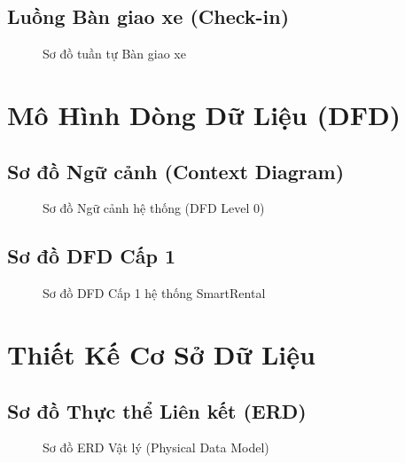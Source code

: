 \documentclass[12pt,a4paper]{report}
\begin{document}
\section{Luồng Bàn giao xe (Check-in)}
\begin{figure}[H]
    \centering
    \fbox{\rule{0pt}{3in} \rule{0.8\linewidth}{0pt}} %
    \caption{Sơ đồ tuần tự Bàn giao xe}
\end{figure}


\chapter{Mô Hình Dòng Dữ Liệu (DFD)}

\section{Sơ đồ Ngữ cảnh (Context Diagram)}
\begin{figure}[H]
    \centering
    \fbox{\rule{0pt}{3in} \rule{0.8\linewidth}{0pt}} %
    \caption{Sơ đồ Ngữ cảnh hệ thống (DFD Level 0)}
\end{figure}

\section{Sơ đồ DFD Cấp 1}
\begin{figure}[H]
    \centering
    \fbox{\rule{0pt}{4in} \rule{0.95\linewidth}{0pt}} %
    \caption{Sơ đồ DFD Cấp 1 hệ thống SmartRental}
\end{figure}


\chapter{Thiết Kế Cơ Sở Dữ Liệu}

\section{Sơ đồ Thực thể Liên kết (ERD)}
\begin{figure}[H]
    \centering
    \fbox{\rule{0pt}{4in} \rule{0.9\linewidth}{0pt}} %
    \caption{Sơ đồ ERD Vật lý (Physical Data Model)}
\end{figure}
\end{document}
